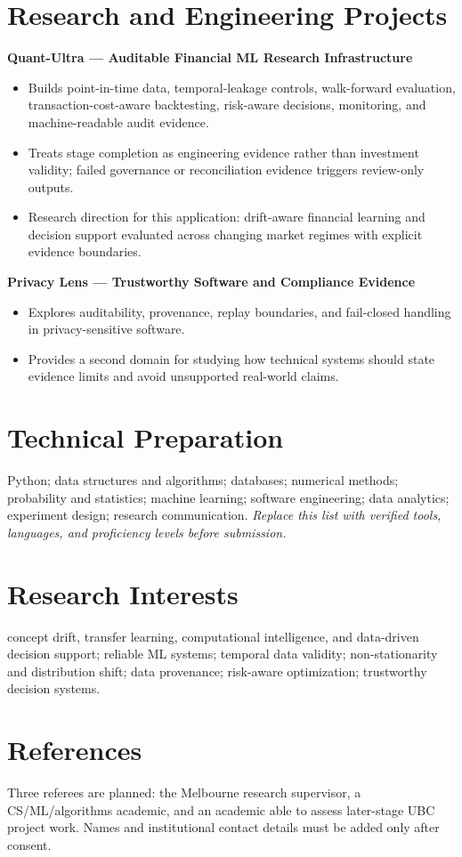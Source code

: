 \documentclass[11pt]{article}
\begin{document}
\section*{Research and Engineering Projects}
\textbf{Quant-Ultra --- Auditable Financial ML Research Infrastructure}
\begin{itemize}
\item Builds point-in-time data, temporal-leakage controls, walk-forward evaluation, transaction-cost-aware backtesting, risk-aware decisions, monitoring, and machine-readable audit evidence.
\item Treats stage completion as engineering evidence rather than investment validity; failed governance or reconciliation evidence triggers review-only outputs.
\item Research direction for this application: drift-aware financial learning and decision support evaluated across changing market regimes with explicit evidence boundaries.
\end{itemize}

\begin{samepage}
\textbf{Privacy Lens --- Trustworthy Software and Compliance Evidence}
\begin{itemize}
\item Explores auditability, provenance, replay boundaries, and fail-closed handling in privacy-sensitive software.
\item Provides a second domain for studying how technical systems should state evidence limits and avoid unsupported real-world claims.
\end{itemize}
\end{samepage}

\section*{Technical Preparation}
Python; data structures and algorithms; databases; numerical methods; probability and statistics; machine learning; software engineering; data analytics; experiment design; research communication. \textit{Replace this list with verified tools, languages, and proficiency levels before submission.}

\section*{Research Interests}
concept drift, transfer learning, computational intelligence, and data-driven decision support; reliable ML systems; temporal data validity; non-stationarity and distribution shift; data provenance; risk-aware optimization; trustworthy decision systems.

\section*{References}
Three referees are planned: the Melbourne research supervisor, a CS/ML/algorithms academic, and an academic able to assess later-stage UBC project work. Names and institutional contact details must be added only after consent.
\end{document}
